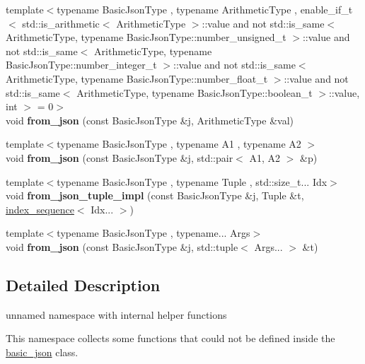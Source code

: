 \begin{DoxyCompactItemize}
{\footnotesize template$<$typename Basic\+Json\+Type , typename Arithmetic\+Type , enable\+\_\+if\+\_\+t$<$ std\+::is\+\_\+arithmetic$<$ Arithmetic\+Type $>$\+::value and not std\+::is\+\_\+same$<$ Arithmetic\+Type, typename Basic\+Json\+Type\+::number\+\_\+unsigned\+\_\+t $>$\+::value and not std\+::is\+\_\+same$<$ Arithmetic\+Type, typename Basic\+Json\+Type\+::number\+\_\+integer\+\_\+t $>$\+::value and not std\+::is\+\_\+same$<$ Arithmetic\+Type, typename Basic\+Json\+Type\+::number\+\_\+float\+\_\+t $>$\+::value and not std\+::is\+\_\+same$<$ Arithmetic\+Type, typename Basic\+Json\+Type\+::boolean\+\_\+t $>$\+::value, int $>$  = 0$>$ }\\void {\bfseries from\+\_\+json} (const Basic\+Json\+Type \&j, Arithmetic\+Type \&val)
\item 
\mbox{\label{namespacenlohmann_1_1detail_aae9f9c2601074e323d49428132cc293d}} 
{\footnotesize template$<$typename Basic\+Json\+Type , typename A1 , typename A2 $>$ }\\void {\bfseries from\+\_\+json} (const Basic\+Json\+Type \&j, std\+::pair$<$ A1, A2 $>$ \&p)
\item 
\mbox{\label{namespacenlohmann_1_1detail_a28253915d9db4a0112d60eaee0422949}} 
{\footnotesize template$<$typename Basic\+Json\+Type , typename Tuple , std\+::size\+\_\+t... Idx$>$ }\\void {\bfseries from\+\_\+json\+\_\+tuple\+\_\+impl} (const Basic\+Json\+Type \&j, Tuple \&t, \mbox{\hyperlink{structnlohmann_1_1detail_1_1index__sequence}{index\+\_\+sequence}}$<$ Idx... $>$)
\item 
\mbox{\label{namespacenlohmann_1_1detail_a8b99ec9b29f3f20a18fc4281fb784e49}} 
{\footnotesize template$<$typename Basic\+Json\+Type , typename... Args$>$ }\\void {\bfseries from\+\_\+json} (const Basic\+Json\+Type \&j, std\+::tuple$<$ Args... $>$ \&t)
\end{DoxyCompactItemize}


\subsection{Detailed Description}
unnamed namespace with internal helper functions 

This namespace collects some functions that could not be defined inside the \mbox{\hyperlink{classnlohmann_1_1basic__json}{basic\+\_\+json}} class.

